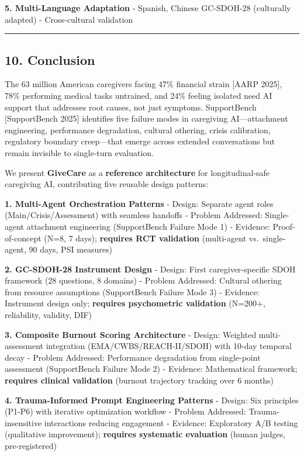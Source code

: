 \documentclass[
]{article}
\begin{document}
\textbf{5. Multi-Language Adaptation} - Spanish, Chinese GC-SDOH-28
(culturally adapted) - Cross-cultural validation

\begin{center}\rule{0.5\linewidth}{0.5pt}\end{center}

\subsection{10. Conclusion}\label{conclusion}

The 63 million American caregivers facing 47\% financial strain {[}AARP
2025{]}, 78\% performing medical tasks untrained, and 24\% feeling
isolated need AI support that addresses root causes, not just symptoms.
SupportBench {[}SupportBench 2025{]} identifies five failure modes in
caregiving AI---attachment engineering, performance degradation,
cultural othering, crisis calibration, regulatory boundary creep---that
emerge across extended conversations but remain invisible to single-turn
evaluation.

We present \textbf{GiveCare} as a \textbf{reference architecture} for
longitudinal-safe caregiving AI, contributing five reusable design
patterns:

\textbf{1. Multi-Agent Orchestration Patterns} - Design: Separate agent
roles (Main/Crisis/Assessment) with seamless handoffs - Problem
Addressed: Single-agent attachment engineering (SupportBench Failure
Mode 1) - Evidence: Proof-of-concept (N=8, 7 days); \textbf{requires RCT
validation} (multi-agent vs.~single-agent, 90 days, PSI measures)

\textbf{2. GC-SDOH-28 Instrument Design} - Design: First
caregiver-specific SDOH framework (28 questions, 8 domains) - Problem
Addressed: Cultural othering from resource assumptions (SupportBench
Failure Mode 3) - Evidence: Instrument design only; \textbf{requires
psychometric validation} (N=200+, reliability, validity, DIF)

\textbf{3. Composite Burnout Scoring Architecture} - Design: Weighted
multi-assessment integration (EMA/CWBS/REACH-II/SDOH) with 10-day
temporal decay - Problem Addressed: Performance degradation from
single-point assessment (SupportBench Failure Mode 2) - Evidence:
Mathematical framework; \textbf{requires clinical validation} (burnout
trajectory tracking over 6 months)

\textbf{4. Trauma-Informed Prompt Engineering Patterns} - Design: Six
principles (P1-P6) with iterative optimization workflow - Problem
Addressed: Trauma-insensitive interactions reducing engagement -
Evidence: Exploratory A/B testing (qualitative improvement);
\textbf{requires systematic evaluation} (human judges, pre-registered)
\end{document}
